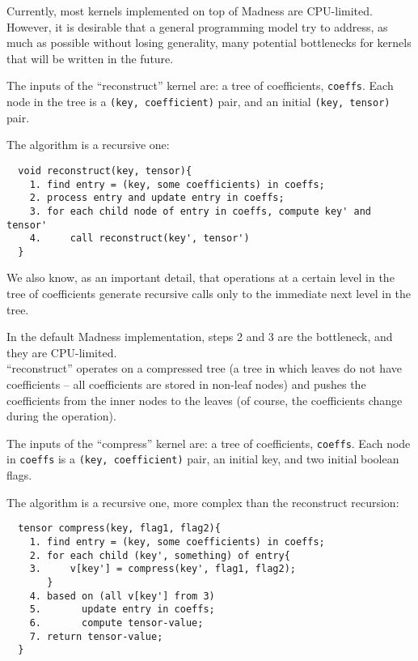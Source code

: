 \documentclass{article}
\begin{document}
Currently, most kernels implemented on top of Madness are
CPU-limited.  However, it is desirable that a general programming model try to
address, as much as possible without losing generality, many potential
bottlenecks for kernels that will be written in the future.

 The inputs of the ``reconstruct'' kernel are: a
tree of coefficients, {\tt coeffs}.  Each node in the tree is a {\tt (key,
coefficient)} pair, and an initial {\tt (key, tensor)} pair.

The algorithm is a recursive one:

\begin{verbatim}
  void reconstruct(key, tensor){
    1. find entry = (key, some coefficients) in coeffs;
    2. process entry and update entry in coeffs;
    3. for each child node of entry in coeffs, compute key' and tensor'
    4.     call reconstruct(key', tensor')
  }
\end{verbatim}

We also know, as an important detail, that operations
at a certain level in the tree of coefficients generate recursive
calls only to the immediate next level in the tree.

In the default Madness implementation, steps 2 and 3 are
the bottleneck, and they are CPU-limited.\\

``reconstruct'' operates on a compressed tree (a tree in which leaves do not
have coefficients -- all coefficients are stored in non-leaf nodes) and pushes the
coefficients from the inner nodes to the leaves (of course, the coefficients change
during the operation). 

 The inputs of the ``compress'' kernel are: a tree of
coefficients, {\tt coeffs}.  Each node in {\tt coeffs} is a {\tt (key,
coefficient)} pair, an initial key, and two initial boolean flags.

The algorithm is a recursive one, more complex than
the reconstruct recursion:

\begin{verbatim}
  tensor compress(key, flag1, flag2){
    1. find entry = (key, some coefficients) in coeffs;
    2. for each child (key', something) of entry{
    3.     v[key'] = compress(key', flag1, flag2);
       }
    4. based on (all v[key'] from 3)
    5.       update entry in coeffs;
    6.       compute tensor-value;
    7. return tensor-value;
  }
\end{verbatim}
\end{document}
